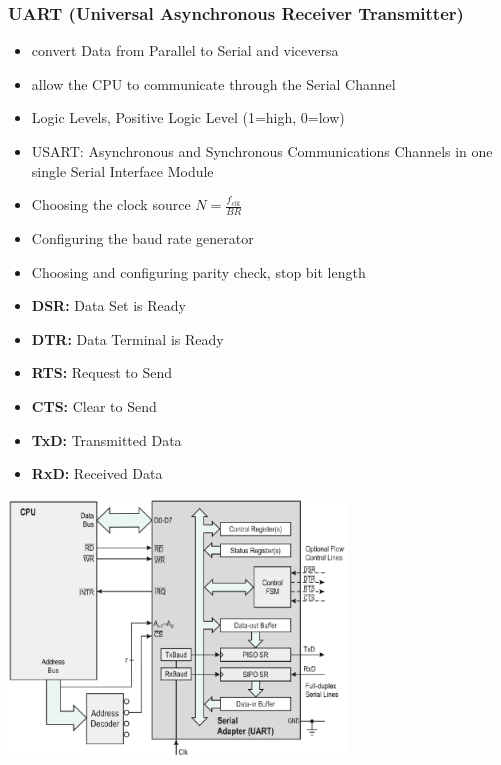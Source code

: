 \subsubsection{UART (Universal Asynchronous Receiver Transmitter)}
\begin{minipage}{10cm}
	\begin{itemize}
		\item convert Data from Parallel to Serial and viceversa
		\item allow the CPU to communicate through the Serial Channel
		\item Logic Levels, Positive Logic Level (1=high, 0=low)
		\item USART: Asynchronous and Synchronous Communications Channels in one single Serial Interface Module
		\item Choosing the clock source $N=\frac{f_{clk}}{BR}$
		\item Configuring the baud rate generator
		\item Choosing and configuring parity check, stop bit length
		\item \textbf{DSR: }Data Set is Ready
		\item \textbf{DTR: }Data Terminal is Ready
		\item \textbf{RTS: }Request to Send
		\item \textbf{CTS: }Clear to Send
		\item \textbf{TxD: }Transmitted Data
		\item \textbf{RxD: }Received Data
	\end{itemize}
\end{minipage}
\begin{minipage}{9cm}
	\includegraphics[width=9cm]{images/uart.png}
\end{minipage}
\clearpage
\pagebreak
